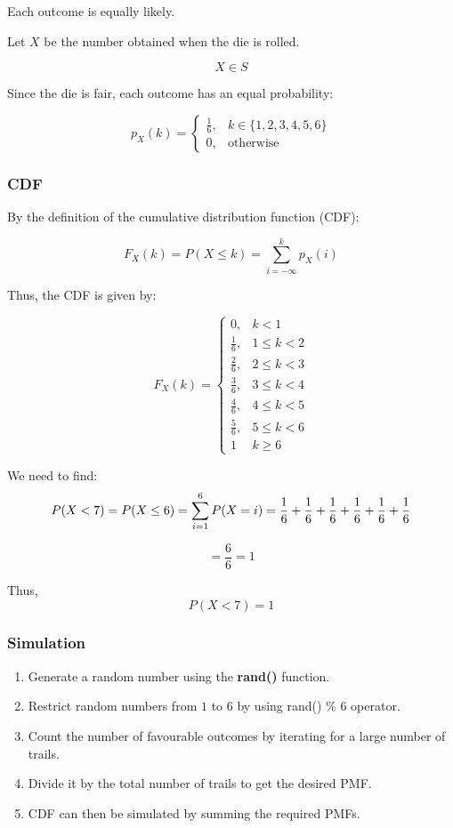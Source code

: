 \documentclass{beamer}
\begin{document}
\begin{frame}
	
Each outcome is equally likely.

Let \( X \) be the number obtained when the die is rolled.

\[
X \in S
\]


Since the die is fair, each outcome has an equal probability:

\[
p_X(k) =
\begin{cases}
\frac{1}{6}, & k \in \{1,2,3,4,5,6\} \\
0, & \text{otherwise}
\end{cases}
\]
\end{frame}
\begin{frame}
\frametitle{CDF}

By the definition of the cumulative distribution function (CDF):

\[
F_X(k) = P(X \leq k) = \sum_{i=-\infty}^{k} p_X(i)
\]

Thus, the CDF is given by:

\[
F_X(k) =
\begin{cases}
0, & k < 1 \\
\frac{1}{6}, & 1 \leq k < 2 \\
\frac{2}{6}, & 2 \leq k < 3 \\
\frac{3}{6}, & 3 \leq k < 4 \\
\frac{4}{6}, & 4 \leq k < 5 \\
\frac{5}{6}, & 5 \leq k < 6 \\
1 & k \geq 6
\end{cases}
\]
\end{frame}
\begin{frame}
We need to find:
\[
P(X < 7) = P(X \leq 6) = \sum_{i=1}^{6} P(X = i)\\
= \frac{1}{6} + \frac{1}{6} + \frac{1}{6} + \frac{1}{6} + \frac{1}{6} + \frac{1}{6}
\]

\[
= \frac{6}{6} = 1
\]

Thus,
\[
P(X < 7) = 1
\]
\end{frame}




\begin{frame}
\frametitle{Simulation}
\begin{enumerate}
	\item Generate a random number  using the \textbf{rand()} function. 
	\item Restrict  random numbers from $1$ to  $6$ by using rand() \% 6 operator.
	\item Count the number of favourable outcomes by iterating for a large number of trails.
	\item Divide it by the total number of trails to get the desired PMF.
	\item CDF can then be simulated by summing the required PMFs.
\end{enumerate}
\end{frame}
\end{document}
